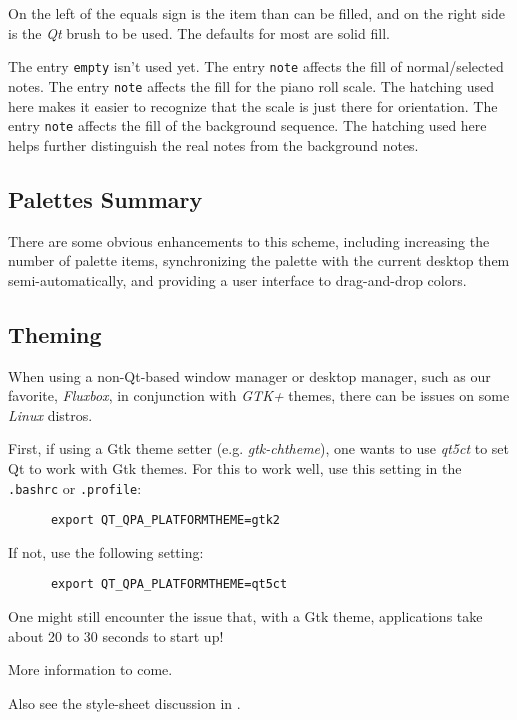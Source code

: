    On the left of the equals sign is the item than can be filled, and on the
   right side is the \textsl{Qt} brush to be used.  The defaults for most are
   solid fill.

   The entry \texttt{empty} isn't used yet.
   The entry \texttt{note} affects the fill of normal/selected notes.
   The entry \texttt{note} affects the fill for the piano roll scale.  The
   hatching used here makes it easier to recognize that the scale is just there
   for orientation.
   The entry \texttt{note} affects the fill of the background sequence.  The
   hatching used here helps further distinguish the real notes from the
   background notes.

\subsection{Palettes Summary}
\label{subsec:palettes_summary}

   There are some obvious enhancements to this scheme, including increasing the
   number of palette items, synchronizing the palette with the current desktop
   them semi-automatically, and providing a user interface to drag-and-drop
   colors.

\subsection{Theming}
\label{subsec:palettes_theming}

   When using a non-Qt-based window manager or desktop manager, such as our
   favorite, \textsl{Fluxbox}, in conjunction with \textsl{GTK+} themes,
   there can be issues on some \textsl{Linux} distros.

   First, if using a Gtk theme setter (e.g. \textsl{gtk-chtheme}), one wants to
   use \textsl{qt5ct} to set Qt to work with Gtk themes.
   For this to work well, use this setting in the \texttt{.bashrc} or
   \texttt{.profile}:

   \begin{verbatim}
      export QT_QPA_PLATFORMTHEME=gtk2
   \end{verbatim}

   If not, use the following setting:

   \begin{verbatim}
      export QT_QPA_PLATFORMTHEME=qt5ct
   \end{verbatim}

   One might still encounter the issue that, with a Gtk theme, applications
   take about 20 to 30 seconds to start up!

   More information to come.

   Also see the style-sheet discussion in
   .


